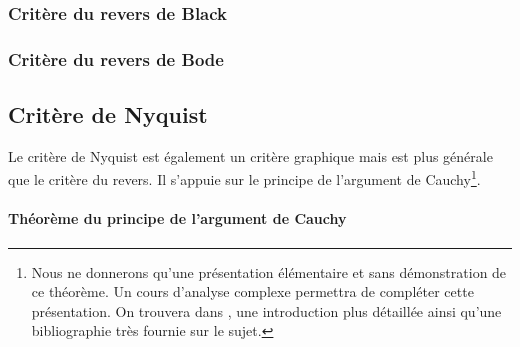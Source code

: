 \subsubsection{Critère du revers de Black}

\subsubsection{Critère du revers de Bode}


\subsection{Critère de Nyquist}

Le critère de Nyquist est également un critère graphique mais 
est plus générale que le critère du revers. Il s'appuie sur le 
principe de l'argument de Cauchy\footnote{Nous ne donnerons qu'une présentation élémentaire et sans démonstration
de ce théorème. Un cours d'analyse complexe permettra de compléter cette présentation. On trouvera dans \cite{laas_pc7bis}, 
une introduction plus détaillée ainsi qu'une bibliographie très fournie sur le sujet.}.

\paragraph{Théorème du principe de l'argument de Cauchy}

